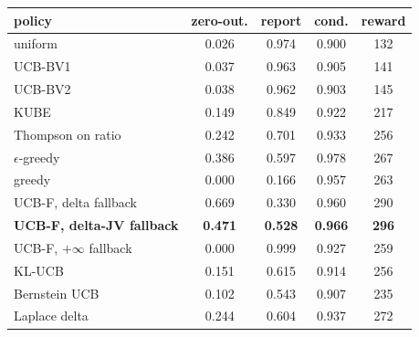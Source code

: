 \begin{tabular}{@{}lcccc@{}}
\toprule
policy & zero-out. & report & cond. & reward \\
\midrule
uniform & 0.026 & 0.974 & 0.900 & 132 \\
\midrule
UCB-BV1 & 0.037 & 0.963 & 0.905 & 141 \\
UCB-BV2 & 0.038 & 0.962 & 0.903 & 145 \\
KUBE & 0.149 & 0.849 & 0.922 & 217 \\
Thompson on ratio & 0.242 & 0.701 & 0.933 & 256 \\
$\epsilon$-greedy & 0.386 & 0.597 & 0.978 & 267 \\
greedy & 0.000 & 0.166 & 0.957 & 263 \\
\midrule
UCB-F, delta fallback & 0.669 & 0.330 & 0.960 & 290 \\
\textbf{UCB-F, delta-JV fallback} & \textbf{0.471} & \textbf{0.528} & \textbf{0.966} & \textbf{296} \\
UCB-F, $+\infty$ fallback & 0.000 & 0.999 & 0.927 & 259 \\
\midrule
KL-UCB & 0.151 & 0.615 & 0.914 & 256 \\
Bernstein UCB & 0.102 & 0.543 & 0.907 & 235 \\
Laplace delta & 0.244 & 0.604 & 0.937 & 272 \\
\bottomrule
\end{tabular}
